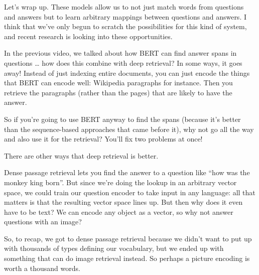 Let’s wrap up.  These models allow us to not just match words from questions and answers but to learn arbitrary mappings between questions and answers.  I think that we’ve only begun to scratch the possibilities for this kind of system, and recent research is looking into these opportunities.  

In the previous video, we talked about how BERT can find answer spans in questions … how does this combine with deep retrieval?  In some ways, it goes away!  Instead of just indexing entire documents, you can just encode the things that BERT can encode well: Wikipedia paragraphs for instance.  Then you retrieve the paragraphs (rather than the pages) that are likely to have the answer.

So if you’re going to use BERT anyway to find the spans (because it’s better than the sequence-based approaches that came before it), why not go all the way and also use it for the retrieval?  You’ll fix two problems at once!

There are other ways that deep retrieval is better.

Dense passage retrieval lets you find the answer to a question like “how was the monkey king born”.  But since we’re doing the lookup in an arbitrary vector space, we could train our question encoder to take input in any language: all that matters is that the resulting vector space lines up.  But then why does it even have to be text?  We can encode any object as a vector, so why not answer questions with an image?

So, to recap, we got to dense passage retrieval because we didn’t want to put up with thousands of types defining our vocabulary, but we ended up with something that can do image retrieval instead.  So perhaps a picture encoding is worth a thousand words.

\label{chapter:methods_generation}

